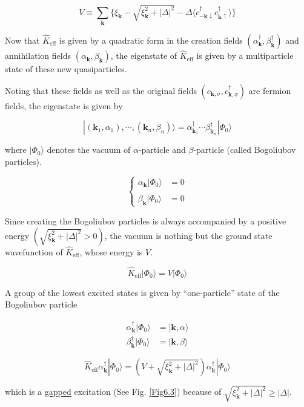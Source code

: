 \[V \equiv\sum_{\bm{k}}\{\xi_{\bm{k}}-\sqrt{\xi_{\bm{k}}^2+|\Delta|^2}-\Delta\langle c_{-\bm{k}\downarrow}^\dagger c_{\bm{k}\uparrow}^\dagger\rangle\} \]

Now that $\hat{K}_{\text{eff}}$ is given by a quadratic form in the creation fields $(\alpha_{\bm{k}}^\dagger, \beta_{\bm{k}}^\dagger)$ and annihilation fields $(\alpha_{\bm{k}}, \beta_{\bm{k}})$, the eigenstate of $\hat{K}_{\text{eff}}$ is given by a multiparticle state of these new quasiparticles. 

Noting that these fields as well as the original fields $(c_{\bm{k},\sigma}, c_{\bm{k},\sigma}^\dagger)$ are fermion fields, the eigenstate is given by 

\[|(\bm{k}_1,\alpha_1),\cdots,(\bm{k}_n,\beta_n)\rangle = \alpha_{\bm{k}_1}^\dagger \cdots \beta_{\bm{k}_n}^\dagger|\Phi_0\rangle \]

where $|\Phi_0\rangle$ denotes the vacuum of $\alpha$-particle and $\beta$-particle (called Bogoliubov particles). 

\[\begin{cases}
\alpha_{\bm{k}}|\Phi_0\rangle &= 0\\
\ & \ \\
\beta_{\bm{k}}|\Phi_0\rangle &= 0
\end{cases}\]

Since creating the Bogoliubov particles is always accompanied by a positive energy $(\sqrt{\xi_{\bm{k}}^2+|\Delta|^2}>0)$, the vacuum is nothing but the ground state wavefunction of $\hat{K}_{\text{eff}}$, whose energy is $V$. 

\[\hat{K}_{\text{eff}}|\Phi_0\rangle = V|\Phi_0\rangle \]

A group of the lowest excited states is given by ``one-particle'' state of the Bogoliubov particle

\[\begin{split}
\alpha_{\bm{k}}^\dagger|\Phi_0\rangle &= |\bm{k},\alpha\rangle\\
\beta_{\bm{k}}^\dagger|\Phi_0\rangle &= |\bm{k}, \beta\rangle
\end{split}\]

\[\hat{K}_{\text{eff}} \alpha_{\bm{k}}^\dagger|\Phi_0\rangle = (V+\sqrt{\xi_{\bm{k}}^2+|\Delta|^2})\alpha_{\bm{k}}^\dagger|\Phi_0\rangle \]

which is a \uline{gapped} excitation (See Fig. \ref{Fig6.3}) because of $\sqrt{\xi_{\bm{k}}^2+|\Delta|^2}\ge|\Delta|$. 


